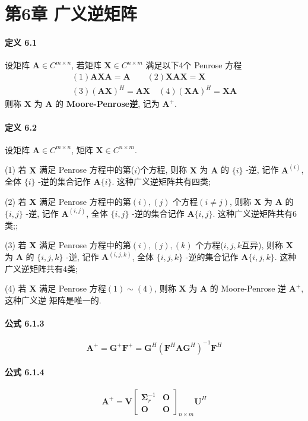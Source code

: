 \documentclass[12pt, a4paper, oneside, fontset=none]{ctexart}
\begin{document}
\section*{第6章 \quad 广义逆矩阵}

\paragraph*{定义 6.1} 设矩阵 $\bm{A} \in C^{m\times n}$, 若矩阵 $\bm{X} \in C^{n\times m}$ 满足以下4个 Penrose 方程
\begin{gather*}
    (1) \bm{AXA} = \bm{A} \quad \quad  (2) \bm{XAX} = \bm{X} \\
    (3) (\bm{AX})^H = \bm{AX} \quad (4) (\bm{XA})^H = \bm{XA}
\end{gather*}
则称 $\bm{X}$ 为 $\bm{A}$ 的 \textbf{Moore-Penrose逆}, 记为 $\bm{A}^+$.

\paragraph*{定义 6.2} 设矩阵 $\bm{A} \in C^{m\times n}$, 矩阵 $\bm{X} \in C^{n\times m}$.
\par (1) 若 $\bm{X}$ 满足 Penrose 方程中的第($i$)个方程, 则称 $\bm{X}$ 为 $\bm{A}$ 的 $\{i\}$ -逆, 记作 $\bm{A}^{(i)}$, 全体
$\{i\}$ -逆的集合记作 $\bm{A}\{i\}$. 这种广义逆矩阵共有四类;
\par (2) 若 $\bm{X}$ 满足 Penrose 方程中的第$(i),(j)$ 个方程$(i\neq j)$, 则称 $\bm{X}$ 为 $\bm{A}$ 的 $\{i,j\}$ -逆, 记作
$\bm{A}^{(i,j)}$, 全体 $\{i,j\}$ -逆的集合记作 $\bm{A}\{i,j\}$. 这种广义逆矩阵共有6类;;
\par (3) 若 $\bm{X}$ 满足 Penrose 方程中的第$(i),(j),(k)$ 个方程($i,j,k$互异), 则称 $\bm{X}$ 为 $\bm{A}$ 的 $\{i,j,k\}$
-逆, 记作 $\bm{A}^{(i,j,k)}$, 全体 $\{i,j,k\}$ -逆的集合记作 $\bm{A}\{i,j,k\}$. 这种广义逆矩阵共有4类;
\par (4) 若 $\bm{X}$ 满足 Penrose 方程$(1) \sim (4)$, 则称 $\bm{X}$ 为 $\bm{A}$ 的 Moore-Penrose 逆 $\bm{A}^+$, 这种广义逆
矩阵是唯一的.
\paragraph*{公式 6.1.3}
$$
    \bm{A}^+ = \bm{G}^+\bm{F}^+ = \bm{G}^H(\bm{F}^H\bm{AG}^H)^{-1}\bm{F}^H
$$

\paragraph*{公式 6.1.4}
$$
    \bm{A}^+ = \bm{V}\begin{bmatrix}
        \bm{\Sigma}^{-1}_r & \bm{O} \\
        \bm{O}             & \bm{O}
    \end{bmatrix}_{n\times m} \bm{U}^H
$$
\end{document}

